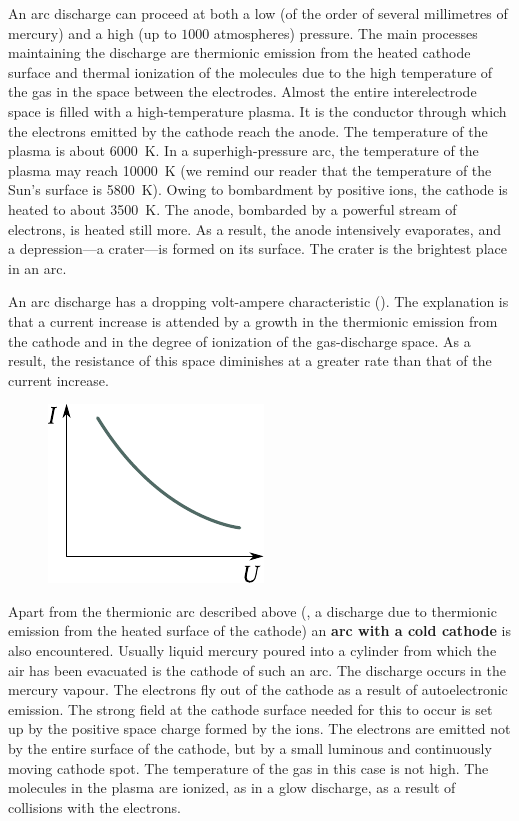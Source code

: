 An arc discharge can proceed at both a low (of the order of several millimetres of mercury) and a high (up to $1000$ atmospheres) pressure.
The main processes maintaining the discharge are thermionic emission from the heated cathode surface and thermal ionization of the molecules due to the high temperature of the gas in the space between the electrodes.
Almost the entire interelectrode space is filled with a high-temperature plasma.
It is the conductor through which the electrons emitted by the cathode reach the anode.
The temperature of the plasma is about \SI{6000}{\kelvin}.
In a superhigh-pressure arc, the temperature of the plasma may reach \SI{10000}{\kelvin} (we remind our reader that the temperature of the Sun's surface is \SI{5800}{\kelvin}).
Owing to bombardment by positive ions, the cathode is heated to about \SI{3500}{\kelvin}.
The anode, bombarded by a powerful stream of electrons, is heated still more.
As a result, the anode intensively evaporates, and a depression---a crater---is formed on its surface.
The crater is the brightest place in an arc.

An arc discharge has a dropping volt-ampere characteristic ().
The explanation is that a current increase is attended by a growth in the thermionic emission from the cathode and in the degree of ionization of the gas-discharge space.
As a result, the resistance of this space diminishes at a greater rate than that of the current increase.

\begin{figure}[t]
	\begin{center}
		\includegraphics[scale=1]{figures/ch_12/fig_12_9.pdf}
		\caption[]{}
		\label{fig:12_9}
	\end{center}
	\vspace{-0.8cm}
\end{figure}

Apart from the thermionic arc described above (\ie, a discharge due to thermionic emission from the heated surface of the cathode) an \textbf{arc with a cold cathode} is also encountered.
Usually liquid mercury poured into a cylinder from which the air has been evacuated is the cathode of such an arc.
The discharge occurs in the mercury vapour.
The electrons fly out of the cathode as a result of autoelectronic emission.
The strong field at the cathode surface needed for this to occur is set up by the positive space charge formed by the ions.
The electrons are emitted not by the entire surface of the cathode, but by a small luminous and continuously moving cathode spot.
The temperature of the gas in this case is not high.
The molecules in the plasma are ionized, as in a glow discharge, as a result of collisions with the electrons.

